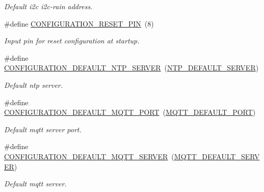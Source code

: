 \begin{DoxyCompactItemize}
\begin{DoxyCompactList}\small\item\em Default i2c i2c-\/rain address. \end{DoxyCompactList}\item 
\mbox{\label{rmap-config_8h_ae90da4786d4ba14563681879dba4d39c}} 
\#define \hyperlink{rmap-config_8h_ae90da4786d4ba14563681879dba4d39c}{C\+O\+N\+F\+I\+G\+U\+R\+A\+T\+I\+O\+N\+\_\+\+R\+E\+S\+E\+T\+\_\+\+P\+IN}~(8)
\begin{DoxyCompactList}\small\item\em Input pin for reset configuration at startup. \end{DoxyCompactList}\item 
\mbox{\label{rmap-config_8h_ad5f167ef5dab674e29cea328f672e0a3}} 
\#define \hyperlink{rmap-config_8h_ad5f167ef5dab674e29cea328f672e0a3}{C\+O\+N\+F\+I\+G\+U\+R\+A\+T\+I\+O\+N\+\_\+\+D\+E\+F\+A\+U\+L\+T\+\_\+\+N\+T\+P\+\_\+\+S\+E\+R\+V\+ER}~(\hyperlink{ntp__config_8h_ac2609c1adfd1a279c59fed52b5827fd3}{N\+T\+P\+\_\+\+D\+E\+F\+A\+U\+L\+T\+\_\+\+S\+E\+R\+V\+ER})
\begin{DoxyCompactList}\small\item\em Default ntp server. \end{DoxyCompactList}\item 
\mbox{\label{rmap-config_8h_ab59fe331bcb2ec0b4c3abd6b13dc8c03}} 
\#define \hyperlink{rmap-config_8h_ab59fe331bcb2ec0b4c3abd6b13dc8c03}{C\+O\+N\+F\+I\+G\+U\+R\+A\+T\+I\+O\+N\+\_\+\+D\+E\+F\+A\+U\+L\+T\+\_\+\+M\+Q\+T\+T\+\_\+\+P\+O\+RT}~(\hyperlink{mqtt__config_8h_a47dbba2fb767e8362864895e3ce87a36}{M\+Q\+T\+T\+\_\+\+D\+E\+F\+A\+U\+L\+T\+\_\+\+P\+O\+RT})
\begin{DoxyCompactList}\small\item\em Default mqtt server port. \end{DoxyCompactList}\item 
\mbox{\label{rmap-config_8h_aec48aba6054d0eab8b9d9fb857f2a33c}} 
\#define \hyperlink{rmap-config_8h_aec48aba6054d0eab8b9d9fb857f2a33c}{C\+O\+N\+F\+I\+G\+U\+R\+A\+T\+I\+O\+N\+\_\+\+D\+E\+F\+A\+U\+L\+T\+\_\+\+M\+Q\+T\+T\+\_\+\+S\+E\+R\+V\+ER}~(\hyperlink{mqtt__config_8h_a509e4f28ec3987701a1c63c238b79716}{M\+Q\+T\+T\+\_\+\+D\+E\+F\+A\+U\+L\+T\+\_\+\+S\+E\+R\+V\+ER})
\begin{DoxyCompactList}\small\item\em Default mqtt server. \end{DoxyCompactList}\item 

\end{DoxyCompactItemize}
